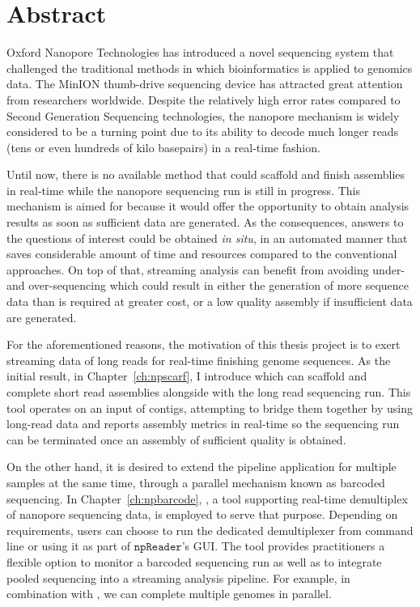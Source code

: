 \chapter*{Abstract}

Oxford Nanopore Technologies has introduced a novel sequencing system that challenged the traditional methods in which bioinformatics is applied to genomics data. The MinION thumb-drive sequencing device has attracted great attention from researchers worldwide. Despite the relatively high error rates compared to Second Generation Sequencing technologies, the nanopore mechanism is widely considered to be a turning point due to its ability to decode much longer reads (tens or even hundreds of kilo basepairs) in a real-time fashion.

Until now, there is no available method that could scaffold and finish assemblies in real-time while the nanopore sequencing run is still in progress. This mechanism is aimed for because it would offer the opportunity to obtain analysis results as soon as sufficient data are generated.
As the consequences, answers to the questions of interest could be obtained \emph{in situ}, in an automated manner that saves considerable amount of time and resources compared to the conventional approaches.
On top of that, streaming analysis can benefit from avoiding under- and over-sequencing which could result in either the generation of more sequence data than is required at greater cost, or a low quality assembly if insufficient data are generated.

For the aforementioned reasons, the motivation of this thesis project is to exert streaming data of long reads for real-time finishing genome sequences.
As the initial result, in Chapter~\ref{ch:npscarf}, I introduce \npscarf{} which can scaffold and complete short read assemblies alongside with the long read sequencing run. This tool operates on an input of contigs, attempting to bridge them together by using long-read data and reports assembly metrics in real-time so the sequencing run can be terminated once an assembly of sufficient quality is obtained.

On the other hand, it is desired to extend the pipeline application for multiple samples at the same time, through a parallel mechanism known as barcoded sequencing.
In Chapter~\ref{ch:npbarcode}, \npbarcode{}, a tool supporting real-time demultiplex of nanopore sequencing data, is employed to serve that purpose. 
Depending on requirements, users can choose to run the dedicated demultiplexer from command line or using it as part of $\mathtt{npReader}$'s GUI. The tool provides practitioners a flexible option to monitor a barcoded sequencing run as well as to integrate pooled sequencing into a streaming analysis pipeline. For example, in combination with \npscarf{}, we can complete multiple genomes in parallel.

